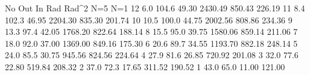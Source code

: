 No	Out	In	Rad	Rad^2	N=5	N=1
12	6.0	104.6	49.30	2430.49	850.43	226.19
11	8.4	102.3	46.95	2204.30	835.30	201.74
10	10.5	100.0	44.75	2002.56	808.86	234.36
9	13.3	97.4	42.05	1768.20	822.64	188.14
8	15.5	95.0	39.75	1580.06	859.14	211.06
7	18.0	92.0	37.00	1369.00	849.16	175.30
6	20.6	89.7	34.55	1193.70	882.18	248.14
5	24.0	85.5	30.75	945.56	824.56	224.64
4	27.9	81.6	26.85	720.92		201.08
3	32.0	77.6	22.80	519.84		208.32
2	37.0	72.3	17.65	311.52		190.52
1	43.0	65.0	11.00	121.00		
